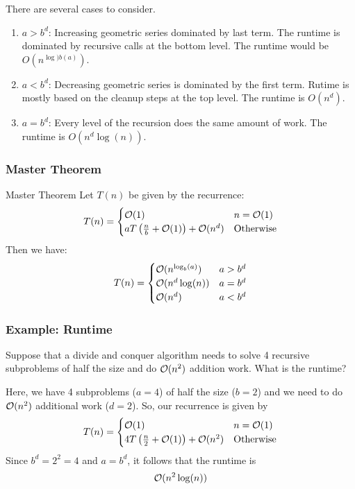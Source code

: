 \documentclass[letterpaper]{article}
\begin{document}
There are several cases to consider. 
\begin{enumerate}
    \item $a > b^d$: Increasing geometric series dominated by last term. The runtime is dominated by recursive calls at the bottom level. The runtime would be $O(n^{\log){b}(a)})$.
    \item $a < b^d$: Decreasing geometric series is dominated by the first term. Rutime is mostly based on the cleanup steps at the top level. The runtime is $O(n^d)$. 
    \item $a = b^d$: Every level of the recursion does the same amount of work. The runtime is $O(n^d \log(n))$. 
\end{enumerate}

\subsubsection{Master Theorem}
\begin{theorem}{Master Theorem}{}
    Let $T(n)$ be given by the recurrence:
    \[T(n) = \begin{cases}
        \mathcal{O}(1) & n = \mathcal{O}(1) \\ 
        aT\left(\frac{n}{b} + \mathcal{O}(1)\right) + \mathcal{O}(n^d) & \text{Otherwise}
    \end{cases}\]
    Then we have: 
    \[T(n) = \begin{cases}
        \mathcal{O}(n^{\log_{b}(a)}) & a > b^d \\ 
        \mathcal{O}(n^d \log(n)) & a = b^d \\ 
        \mathcal{O}(n^d) & a < b^d
    \end{cases}\]
\end{theorem}

\subsubsection{Example: Runtime}
Suppose that a divide and conquer algorithm needs to solve 4 recursive subproblems of half the size and do $\mathcal{O}(n^2)$ addition work. What is the runtime? 
\begin{mdframed}[]
    Here, we have 4 subproblems ($a = 4$) of half the size ($b = 2$) and we need to do $\mathcal{O}(n^2)$ additional work ($d = 2$). So, our recurrence is given by 
    \[T(n) = \begin{cases}
        \mathcal{O}(1) & n = \mathcal{O}(1) \\ 
        4T\left(\frac{n}{2} + \mathcal{O}(1)\right) + \mathcal{O}(n^2) & \text{Otherwise}
    \end{cases}\]
    Since $b^d = 2^2 = 4$ and $a = b^d$, it follows that the runtime is 
    \[\mathcal{O}(n^2 \log(n))\]
\end{mdframed}
\end{document}
